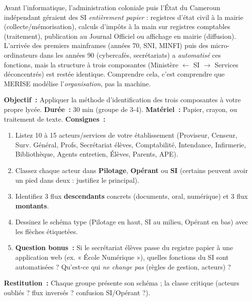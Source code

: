 \documentclass[11pt]{article}
\begin{document}
\begin{savaistu}
Avant l'informatique, l'administration coloniale puis l'État du Cameroun indépendant géraient des SI \emph{entièrement papier} : registres d'état civil à la mairie (collecte/mémorisation), calculs d'impôts à la main sur registres comptables (traitement), publication au Journal Officiel ou affichage en mairie (diffusion). L'arrivée des premiers mainframes (années 70, SNI, MINFI) puis des micro-ordinateurs dans les années 90 (cybercafés, secrétariats) a \emph{automatisé} ces fonctions, mais la structure à trois composantes (Ministère $\leftarrow$ SI $\rightarrow$ Services déconcentrés) est restée identique. Comprendre cela, c'est comprendre que MERISE modélise l'\emph{organisation}, pas la machine.
\end{savaistu}

\begin{experience}
\textbf{Objectif~:} Appliquer la méthode d'identification des trois composantes à votre propre lycée.
\textbf{Durée~:} 30 min (groupe de 3-4).
\textbf{Matériel~:} Papier, crayon, ou traitement de texte.
\textbf{Consignes~:}
\begin{enumerate}
    \item Listez 10 à 15 acteurs/services de votre établissement (Proviseur, Censeur, Surv. Général, Profs, Secrétariat élèves, Comptabilité, Intendance, Infirmerie, Bibliothèque, Agents entretien, Élèves, Parents, APE).
    \item Classez chaque acteur dans \textbf{Pilotage}, \textbf{Opérant} ou \textbf{SI} (certains peuvent avoir un pied dans deux : justifiez le principal).
    \item Identifiez 3 flux \textbf{descendants} concrets (documents, oral, numérique) et 3 flux \textbf{montants}.
    \item Dessinez le schéma type (Pilotage en haut, SI au milieu, Opérant en bas) avec les flèches étiquetées.
    \item \textbf{Question bonus~:} Si le secrétariat élèves passe du registre papier à une application web (ex. « École Numérique »), quelles fonctions du SI sont automatisées ? Qu'est-ce qui \emph{ne change pas} (règles de gestion, acteurs) ?
\end{enumerate}
\textbf{Restitution~:} Chaque groupe présente son schéma ; la classe critique (acteurs oubliés ? flux inversés ? confusion SI/Opérant ?).
\end{experience}
\end{document}
